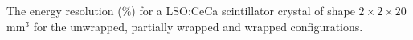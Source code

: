 \label{fig:energyresolution-20} The energy resolution ($\%$) for a LSO:CeCa scintillator crystal of shape $2\times2\times20$ mm$^3$ for the unwrapped, partially wrapped and wrapped configurations.